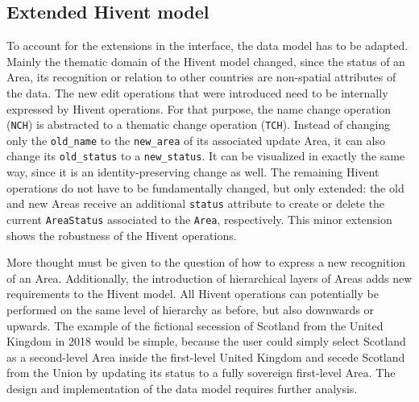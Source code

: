 


\subsection{Extended Hivent model} %
\label{sub:extended_hivent_model}

To account for the extensions in the interface, the data model has to be adapted. Mainly the thematic domain of the Hivent model changed, since the status of an Area, its recognition or relation to other countries are non-spatial attributes of the data. The new edit operations that were introduced need to be internally expressed by Hivent operations. For that purpose, the name change operation (\texttt{NCH}) is abstracted to a thematic change operation (\texttt{TCH}). Instead of changing only the \texttt{old\_name} to the \texttt{new\_area} of its associated update Area, it can also change its \texttt{old\_status} to a \texttt{new\_status}. It can be visualized in exactly the same way, since it is an identity-preserving change as well. The remaining Hivent operations do not have to be fundamentally changed, but only extended: the old and new Areas receive an additional \texttt{status} attribute to create or delete the current \texttt{AreaStatus} associated to the \texttt{Area}, respectively. This minor extension shows the robustness of the Hivent operations.

More thought must be given to the question of how to express a new recognition of an Area. Additionally, the introduction of hierarchical layers of Areas adds new requirements to the Hivent model. All Hivent operations can potentially be performed on the same level of hierarchy as before, but also downwards or upwards. The example of the fictional secession of Scotland from the United Kingdom in 2018 would be simple, because the user could simply select Scotland as a second-level Area inside the first-level United Kingdom and secede Scotland from the Union by updating its status to a fully sovereign first-level Area. The design and implementation of the data model requires further analysis.

